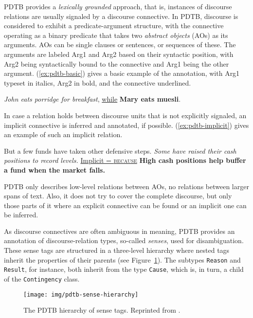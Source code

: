 \documentclass[
    a4paper,%
    12pt,%
    oneside,%
    toc=bibliography,
    final,
]{scrartcl}
\begin{document}
PDTB provides a \textit{lexically grounded} approach, that is, instances of discourse relations are usually signaled by a discourse connective. In PDTB, discourse is considered to exhibit a predicate-argument structure, with the connective operating as a binary predicate that takes two \textit{abstract objects} (AOs) as its arguments. AOs can be single clauses or sentences, or sequences of these. The arguments are labeled Arg1 and Arg2 based on their syntactic position, with Arg2 being syntactically bound to the connective and Arg1 being the other argument. (\ref{ex:pdtb-basic}) \citep[taken from][3]{Webber2006} gives a basic example of the annotation, with Arg1 typeset in italics, Arg2 in bold, and the connective underlined.

\begin{exe}
\ex \label{ex:pdtb-basic} \textit{John eats porridge for breakfast}, \underline{while} \textbf{Mary eats muesli}.
\end{exe}

In case a relation holds between discourse units that is not explicitly signaled, an implicit connective is inferred and annotated, if possible. (\ref{ex:pdtb-implicit}) \citep[from][3]{Prasad2008} gives an example of such an implicit relation.

\begin{exe}
\ex \label{ex:pdtb-implicit} But a few funds have taken other defensive steps. \textit{Some have raised their cash positions to record levels.} \underline{Implicit = \textsc{because}} \textbf{High cash positions help buffer a fund when the market falls.}
\end{exe}

PDTB only describes low-level relations between AOs, no relations between larger spans of text. Also, it does not try to cover the complete discourse, but only those parts of it where an explicit connective can be found or an implicit one can be inferred.

As discourse connectives are often ambiguous in meaning, PDTB provides an annotation of discourse-relation types, so-called \textit{senses}, used for disambiguation. These sense tags are structured in a three-level hierarchy where nested tags inherit the properties of their parents (see Figure~\ref{fig:pdtb-sense-hierarchy}). The subtypes \lstinline|Reason| and \lstinline|Result|, for instance, both inherit from the type \lstinline|Cause|, which is, in turn, a child of the \lstinline|Contingency| class.

\begin{figure}[h!]
\texttt{[image: img/pdtb-sense-hierarchy]}

\caption{The PDTB hierarchy of sense tags. Reprinted from \citet[5]{Prasad2008}.}
\label{fig:pdtb-sense-hierarchy}
\end{figure}
\end{document}
